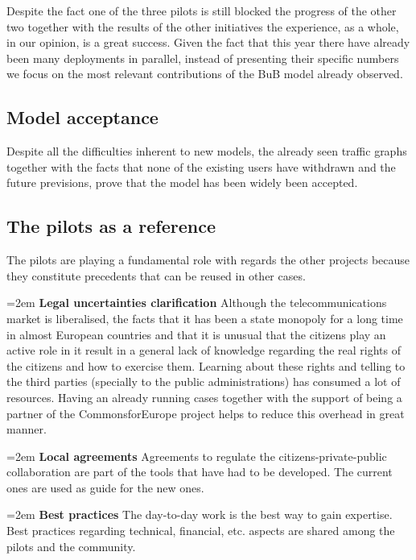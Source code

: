 Despite the fact one of the three pilots is still blocked the progress of the other two together with the results of the other initiatives the experience, as a whole, in our opinion, is a great success. Given the fact that this year there have already been many deployments in parallel, instead of presenting their specific numbers we focus on the most relevant contributions of the BuB model already observed.

\FloatBarrier
\subsection{Model acceptance}
\label{res_sustain}

Despite all the difficulties inherent to new models, the already seen traffic graphs together with the facts that none of the existing users have withdrawn and the future previsions, prove that the model has been widely been accepted.


\FloatBarrier
\subsection{The pilots as a reference}
\label{res_sustain}

The pilots are playing a fundamental role with regards the other projects because they constitute precedents that can be reused in other cases.

\hangindent=2em
\textbf{Legal uncertainties clarification}
Although the telecommunications market is liberalised, the facts that it has been a state monopoly for a long time in almost European countries and that it is unusual that the citizens play an active role in it result in a general lack of knowledge regarding the real rights of the citizens and how to exercise them. Learning about these rights and telling to the third parties (specially to the public administrations) has consumed a lot of resources. Having an already running cases together with the support of being a partner of the CommonsforEurope project helps to reduce this overhead in great manner.

\hangindent=2em
\textbf{Local agreements}
Agreements to regulate the citizens-private-public collaboration are part of the tools that have had to be developed. The current ones are used as guide for the new ones.

\hangindent=2em
\textbf{Best practices}
The day-to-day work is the best way to gain expertise. Best practices regarding technical, financial, etc. aspects are shared among the pilots and the community.


